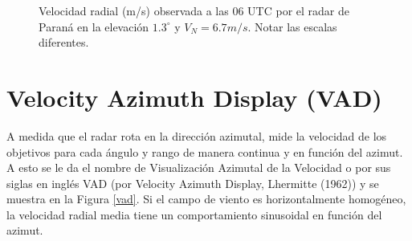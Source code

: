 \documentclass[12pt,spanish,oneside]{book}
\begin{document}
\begin{figure}
\caption{Velocidad radial (m/s) observada a las 06 UTC por el radar de Paraná en la elevación $1.3^{\circ}$ y $V_N = 6.7 m/s$. Notar las escalas diferentes.}\label{fig:aliasing}
\end{figure}

\section{Velocity Azimuth Display
(VAD)}\label{velocity-azimuth-display-vad}

A medida que el radar rota en la dirección azimutal, mide la velocidad
de los objetivos para cada ángulo y rango de manera continua y en
función del azimut. A esto se le da el nombre de Visualización Azimutal
de la Velocidad o por sus siglas en inglés VAD (por Velocity Azimuth
Display, Lhermitte (1962)) y se muestra en la Figura \ref{vad}. Si el
campo de viento es horizontalmente homogéneo, la velocidad radial media
tiene un comportamiento sinusoidal en función del azimut.
\end{document}
